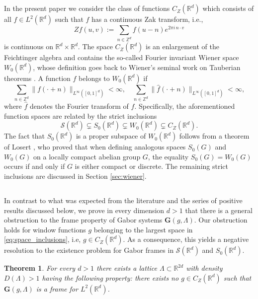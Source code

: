 \documentclass[reqno,a4paper,12pt]{amsart}
\numberwithin{equation}{section}
\newtheorem{theorem}[definition]{Theorem}
\def\Z{{\mathbb Z}}
\def\R{{\mathbb R}}
\newcommand{\Rd}{{\R^d}}
\newcommand{\ltd}{{L^2(\R^d)}}
\newcommand\1{\mathds{1}}
\begin{document}
\subsection{}
In the present paper we consider the class of functions $C_Z(\Rd)$ which consists of all $f \in \ltd$ such that $f$ has a continuous Zak transform, i.e.,
$$
Zf(u,v):=\sum_{n\in\mathbb Z^d} f(u-n)e^{2\pi i\,n\cdot v}
$$
is continuous on $\R^d \times \R^d$.
The space $C_Z(\Rd)$ is an enlargement of the Feichtinger algebra and contains the so-called Fourier invariant Wiener space $W_0(\Rd)$, whose definition goes back to Wiener's seminal work on Tauberian theorems \cite{wiener1932tauberian}. A function $f$ belongs to $W_0(\Rd)$ if
$$
\sum_{n \in \Z^d} \| f(\cdot + n) \|_{L^\infty([0,1]^d)} < \infty, \quad \sum_{n \in \Z^d} \| \hat f(\cdot + n) \|_{L^\infty([0,1]^d)} < \infty,
$$
where $\hat f$ denotes the Fourier transform of $f$. Specifically, the aforementioned function spaces are related by the strict inclusions
\begin{equation}\label{eq:space_inclusions}
    \mathcal{S}(\Rd) \subsetneq S_0(\Rd) \subsetneq W_0(\Rd) \subsetneq C_Z(\Rd).
\end{equation}
The fact that $S_0(\Rd)$ is a proper subspace of $W_0(\Rd)$ follows from a theorem of Losert \cite[Theorem 2]{losert1980characterization}, who proved that when defining analogous spaces $S_0(G)$ and $W_0(G)$ on a locally compact abelian group $G$, the equality $S_0(G) = W_0(G)$ occurs if and only if $G$ is either compact or discrete. The remaining strict inclusions are discussed in Section \ref{sec:wiener}.

\subsection{}
In contrast to what was expected from the literature and the series of positive results discussed below, we prove in every dimension $d > 1$ that there is a general obstruction to the frame property of Gabor systems $\mathbf{G}(g,\Lambda)$. Our obstruction holds for window functions $g$ belonging to the largest space in \eqref{eq:space_inclusions}, i.e, $g \in C_Z(\mathbb{R}^d)$. As a consequence, this yields a negative resolution to the existence problem for Gabor frames in $\mathcal{S}(\Rd)$ and $S_0(\Rd)$.

\begin{theorem}\label{thm:conj}
    For every $d > 1$ there exists a lattice $\Lambda \subset \R^{2d}$ with density $D(\Lambda) > 1$ having the following property: there exists no $g \in C_Z(\mathbb{R}^d)$ such that $\mathbf G(g,\Lambda)$ is a frame for $L^2(\mathbb{R}^d)$.
\end{theorem}
\end{document}
